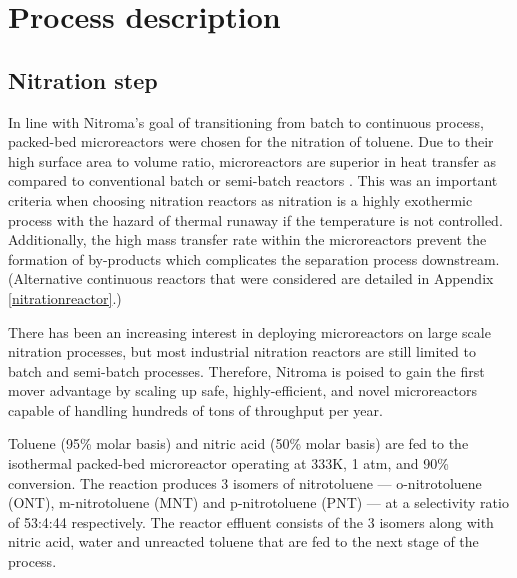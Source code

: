 \section{Process description}
\label{sec:process}
\subsection{Nitration step}
In line with Nitroma's goal of transitioning from batch to continuous process, packed-bed microreactors were chosen for the nitration of toluene. Due to their high surface area to volume ratio, microreactors are superior in heat transfer as compared to conventional batch or semi-batch reactors \cite{halder_nitration_2007}. This was an important criteria when choosing nitration reactors as nitration is a highly exothermic process with the hazard of thermal runaway if the temperature is not controlled. Additionally, the high mass transfer rate within the microreactors prevent the formation of by-products \cite{halder_nitration_2007} which complicates the separation process downstream.
(Alternative continuous reactors that were considered are detailed in Appendix \ref{nitrationreactor}.)

There has been an increasing interest in deploying microreactors on large scale nitration processes, but most industrial nitration reactors are still limited to batch and semi-batch processes. Therefore, Nitroma is poised to gain the first mover advantage by scaling up safe, highly-efficient, and novel microreactors capable of handling hundreds of tons of throughput per year.

Toluene (95\% molar basis) and nitric acid (50\% molar basis) are fed to the isothermal packed-bed microreactor operating at 333K, 1 atm, and 90\% conversion. The reaction produces 3 isomers of nitrotoluene --- o-nitrotoluene (ONT), m-nitrotoluene (MNT) and p-nitrotoluene (PNT) --- at a selectivity ratio of 53:4:44 respectively. The reactor effluent consists of the 3 isomers along with nitric acid, water and unreacted toluene that are fed to the next stage of the process.


